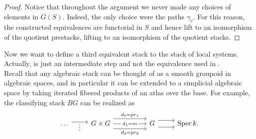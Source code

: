 \begin{proof}
Notice that throughout the argument we never made any choices of elements in $G(S)$. Indeed, the only choice were the paths $\gamma_v$. For this reason, the constructed equivalences are functorial in $S$ and hence lift to an isomorphism of the quotient prestacks, lifting to an isomorphism of the quotient stacks.
\end{proof}

Now we want to define a third equivalent stack to the stack of local systems. Actually,  is just an intermediate step and not the equivalence used in \cite{Shende-weights}.\\
Recall that any algebraic stack can be thought of as a smooth groupoid in algebraic spaces, and in particular it can be extended to a simplicial algebraic space by taking iterated fibered products of an atlas over the base. For example, the classifying stack $BG$ can be realized as
\begin{equation}
\begin{tikzcd}
	\dots & {G \times G} && G & {\Spec k.}
	\arrow["\vdots"'{yshift=5pt}, shift left, from=1-1, to=1-2]
	\arrow["{d_1 = m}"{description}, from=1-2, to=1-4]
	\arrow["{d_0 = pr_1}", shift left=3, from=1-2, to=1-4]
	\arrow["{d_2 = pr_2}"', shift right=3, from=1-2, to=1-4]
	\arrow[shift right=2, from=1-4, to=1-5]
	\arrow[shift left=2, from=1-4, to=1-5]
\end{tikzcd}
\end{equation}

